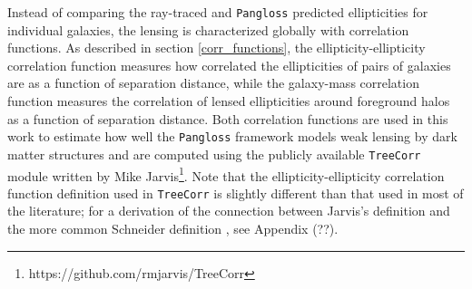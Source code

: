 \documentclass[%
 reprint,
 amsmath,amssymb,
 aps,nofootinbib
]{revtex4-1}
\begin{document}
Instead of comparing the ray-traced and \texttt{Pangloss} predicted ellipticities for individual galaxies, the lensing is characterized globally with correlation functions. As described in section \ref{corr_functions}, the ellipticity-ellipticity correlation function measures how correlated the ellipticities of pairs of galaxies are as a function of separation distance, while the galaxy-mass correlation function measures the correlation of lensed ellipticities around foreground halos as a function of separation distance. Both correlation functions are used in this work to estimate how well the \texttt{Pangloss} framework models weak lensing by dark matter structures and are computed using the publicly available \texttt{TreeCorr} module written by Mike Jarvis\footnote{https://github.com/rmjarvis/TreeCorr}. Note that the ellipticity-ellipticity correlation function definition used in \texttt{TreeCorr} is slightly different than that used in most of the literature; for a derivation of the connection between Jarvis's definition and the more common Schneider definition \cite{schneider}, see Appendix (??).



\end{document}
